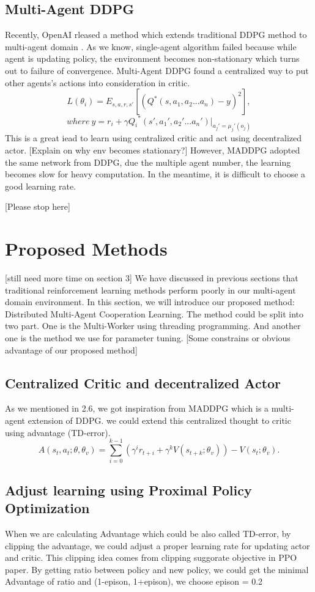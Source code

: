 \documentclass[11pt,twocolumn]{jarticle} %
\begin{document}
\subsection{Multi-Agent DDPG}
Recently, OpenAI rleased a method which extends traditional DDPG method to multi-agent domain \cite{4}. As we know, single-agent algorithm failed because while agent is updating policy, the environment becomes non-stationary which turns out to failure of convergence. Multi-Agent DDPG found a centralized way to put other agents's actions into consideration in critic.
\begin{equation}
L(\theta_i) = E_{s,a,r,s'}[(Q^*(s, a_1, a_2 ... a_n) - y)^2],  
\end{equation}
$$where\ y = r_i + \gamma{Q_i}^*(s', a_1', a_2' ... a_n') | _{a_j'=\mu_j'(o_j)}$$
This is a great iead to learn using centralized critic and act using decentralized actor. 
[Explain on why env becomes stationary?]
However, MADDPG adopted the same network from DDPG, due the multiple agent number, the learning becomes slow for heavy computation. In the meantime, it is difficult to choose a good learning rate.

[Please stop here]
\section{Proposed Methods}[still need more time on section 3]
We have discussed in previous sections that traditional reinforcement learning methods perform poorly in our multi-agent domain environment. In this section, we will introduce our proposed method: Distributed Multi-Agent Cooperation Learning. The method could be split into two part. One is the Multi-Worker using threading programming. And another one is the method we use for parameter tuning.
[Some constrains or obvious advantage of our proposed method]

\subsection{Centralized Critic and decentralized Actor}
As we mentioned in 2.6, we got inspiration from MADDPG which is a multi-agent extension of DDPG. we could extend this centralized thought to critic using advantage (TD-error).
\begin{equation}
A(s_t, a_t; \theta, \theta_v) = \sum_{i=0}^{k-1}(\gamma^i r_{t+i} + \gamma^k V(s_{t+k};\theta_v)) - V(s_t; \theta_v).
\end{equation}
\subsection{Adjust learning using Proximal Policy Optimization}
When we are calculating Advantage which could be also called TD-error, by clipping the advantage, we could adjust a proper learning rate for updating actor and critic. This clipping idea comes from clipping suggorate objective in PPO paper. By getting ratio between policy and new policy, we could get the minimal Advantage of ratio and (1-epison, 1+epison), we choose epison = 0.2
\end{document}
